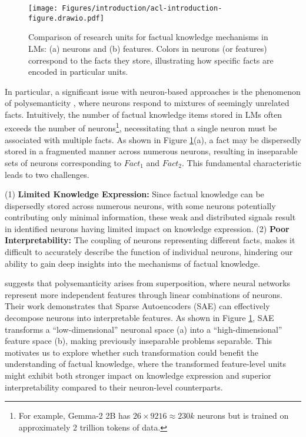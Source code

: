 \begin{figure}
    \centering
    \texttt{[image: Figures/introduction/acl-introduction-figure.drawio.pdf]}
\caption{Comparison of research units for factual knowledge mechanisms in LMs: (a) neurons and (b) features. Colors in neurons (or features) correspond to the facts they store, illustrating how specific facts are encoded in particular units.}
    \label{fig:introduction_figure1}
\end{figure}
In particular, a significant issue with neuron-based approaches is the phenomenon of polysemanticity \citep{bricken2023monosemanticity,Cunningham2023SparseAF}, where neurons  respond to mixtures of seemingly unrelated  facts. Intuitively, the number of factual knowledge items stored in LMs often exceeds the number of neurons\footnote{For example, Gemma-2 2B has $26\times9216 \approx 230k$ neurons but is trained on approximately 2 trillion tokens of data.}, necessitating that a single neuron must be associated with multiple facts.
As shown in Figure \ref{fig:introduction_figure1}(a), a fact may be dispersedly stored in a fragmented manner across numerous neurons, resulting in inseparable sets of neurons corresponding to $Fact_1$ and $Fact_2$. This fundamental characteristic leads to two challenges.

(1) \textbf{Limited Knowledge Expression:} 
Since factual knowledge can be dispersedly stored across numerous neurons, with some neurons potentially contributing only minimal information, these weak and distributed signals result in identified neurons having limited impact on knowledge expression.
(2) \textbf{Poor Interpretability:} The coupling of neurons representing different facts, makes it difficult to accurately describe the function of individual neurons, hindering our ability to gain deep insights into the mechanisms of factual knowledge.

\citet{bricken2023monosemanticity} suggests that polysemanticity arises from superposition, where neural networks represent more independent features through linear combinations of neurons. 
Their work demonstrates that Sparse Autoencoders (SAE) can effectively decompose neurons into interpretable features. 
As shown in Figure \ref{fig:introduction_figure1}, SAE transforms a ``low-dimensional'' neuronal space (a) into a ``high-dimensional'' feature space (b), making previously inseparable problems separable. This motivates us to explore whether such transformation could benefit the understanding of factual knowledge, where the transformed feature-level units might exhibit both stronger impact on knowledge expression and superior interpretability compared to their neuron-level counterparts.

